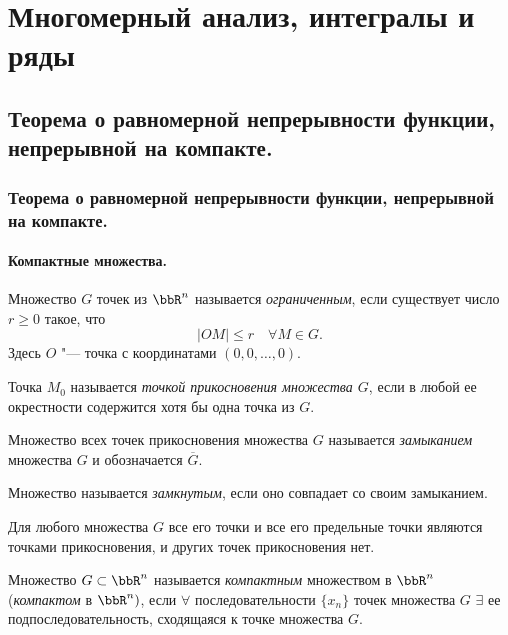 \part{Многомерный анализ, интегралы и ряды}

\chapter{Теорема о равномерной непрерывности функции, непрерывной на компакте.}

\section{Теорема о равномерной непрерывности функции, непрерывной на компакте.}

\subsection{Компактные множества.}

\begin{defn}
Множество $G$ точек из $\bbR ^n$ называется \textit{ограниченным}, если существует число $r\ge 0$ такое, что
$$
|OM|\le r \quad \forall M\in G.
$$
Здесь $O$ "--- точка с координатами $(0,0,\dots,0)$.
\end{defn}

\begin{defn}
Точка $M_0$ называется \textit{точкой прикосновения множества $G$}, если в любой ее окрестности содержится хотя бы одна точка из $G$.
\end{defn}

\begin{defn}
Множество всех точек прикосновения множества $G$ называется \textit{замыканием} множества $G$ и обозначается $\overline{G}$.
\end{defn}

\begin{defn}
Множество называется \textit{замкнутым}, если оно совпадает со своим замыканием.
\end{defn}

Для любого множества $G$ все его точки и все его предельные точки являются точками прикосновения, и других точек прикосновения нет.

\begin{defn}
Множество $G \subset \bbR^n$ называется \textit{компактным} множеством в $\bbR^n$ (\textit{компактом} в $\bbR^n)$, если $\forall$ последовательности $\{ x_n \}$ точек множества $G$ $\exists$ ее подпоследовательность, сходящаяся к точке множества $G$.
\end{defn}

